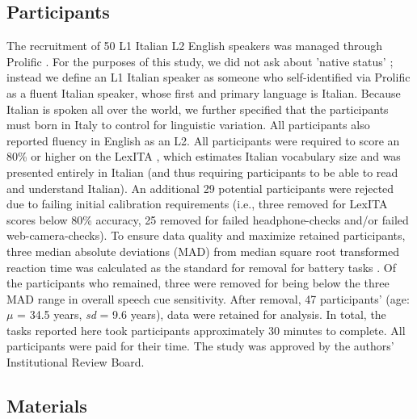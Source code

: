 
\subsection{Participants}
The recruitment of 50 L1 Italian L2 English speakers was managed through Prolific \citep{Palan_2018}. For the purposes of this study, we did not ask about 'native status' \citep{Brown_Tusmagambet_Rahming_Tu_DeSalvo_Wiener_2023} ; instead we define an L1 Italian speaker as someone who self-identified via Prolific as a fluent Italian speaker, whose first and primary language is Italian. Because Italian is spoken all over the world, we further specified that the participants must born in Italy to control for linguistic variation. All participants also reported fluency in English as an L2. All participants were required to score an 80\% or higher on the LexITA \citep{Amenta2021}, which estimates Italian vocabulary size and was presented entirely in Italian (and thus requiring participants to be able to read and understand Italian). An additional 29 potential participants were rejected due to failing initial calibration requirements (i.e., three removed for LexITA scores below 80\% accuracy, 25 removed for failed headphone-checks \citep{milne_2021} and/or failed web-camera-checks). To ensure data quality and maximize retained participants, three median absolute deviations (MAD) from median square root transformed reaction time was calculated as the standard for removal for battery tasks \citep{Leys_2013}. Of the participants who remained, three were removed for being below the three MAD \citep{Leys_2013} range in overall speech cue sensitivity. After removal, 47 participants' (age: $\mu$ = 34.5 years, \textit{sd} = 9.6 years), data were retained for analysis. In total, the tasks reported here took participants approximately 30 minutes to complete. All participants were paid for their time. The study was approved by the authors' Institutional Review Board.

\subsection{Materials}

